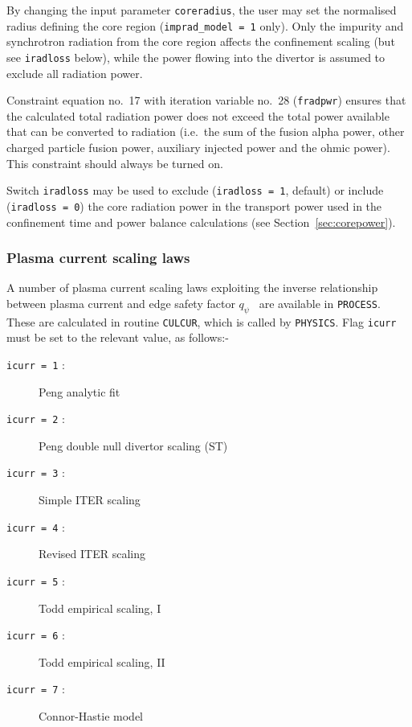 \documentclass[11pt,a4paper]{report}
\newcommand{\process}{\mbox{\texttt{PROCESS}}}
\begin{document}
By changing the input parameter \texttt{coreradius}, the user may set the
normalised radius defining the core region (\texttt{imprad\_model = 1}
only). Only the impurity and synchrotron radiation from the core region
affects the confinement scaling (but see \texttt{iradloss} below), while the
power flowing into the divertor is assumed to exclude all radiation power.



Constraint equation no.~17 with iteration variable no.~28 (\texttt{fradpwr})
ensures that the calculated total radiation power does not exceed the total
power available that can be converted to radiation (i.e.\ the sum of the fusion
alpha power, other charged particle fusion power, auxiliary injected power and
the ohmic power). This constraint should always be turned on.

Switch \texttt{iradloss} may be used to exclude (\texttt{iradloss = 1},
default) or include (\texttt{iradloss = 0}) the core radiation power in the
transport power used in the confinement time and power balance calculations
(see Section~\ref{sec:corepower}).

\subsubsection{Plasma current scaling laws}
\label{sec:current_scaling}

A number of plasma current scaling laws exploiting the inverse relationship
between plasma current and edge safety factor $q_{\psi}$~\cite{172} are
available in \process. These are calculated in routine \texttt{CULCUR}, which
is called by \texttt{PHYSICS}.  Flag \texttt{icurr} must be set to the
relevant value, as follows:-
\begin{description}
\item [\texttt{icurr = 1} :] Peng analytic fit
\item [\texttt{icurr = 2} :] Peng double null divertor scaling (ST)~\cite{storac}
\item [\texttt{icurr = 3} :] Simple ITER scaling
\item [\texttt{icurr = 4} :] Revised ITER scaling~\cite{Uckan88}
\item [\texttt{icurr = 5} :] Todd empirical scaling, I
\item [\texttt{icurr = 6} :] Todd empirical scaling, II
\item [\texttt{icurr = 7} :] Connor-Hastie model
\end{description}
\end{document}
